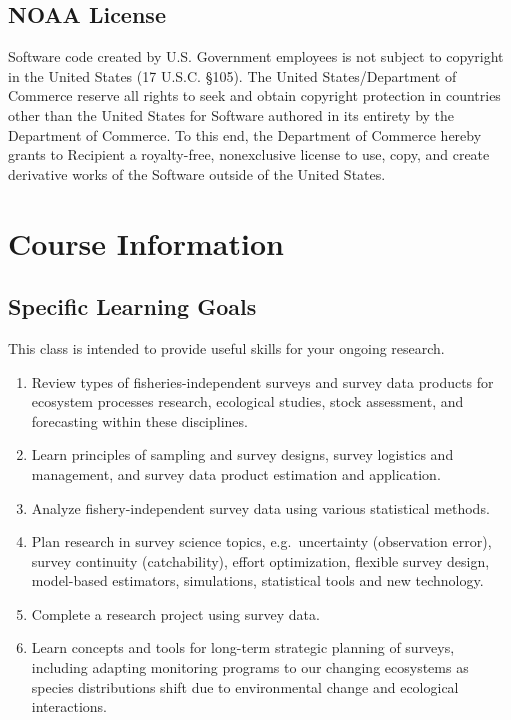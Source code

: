 \documentclass[
  letterpaper,
  oneside,
  open=any]{scrbook}
\providecommand{\tightlist}{%
  \setlength{\itemsep}{0pt}\setlength{\parskip}{0pt}}\usepackage{longtable,booktabs,array}
\begin{document}
\section{NOAA License}\label{noaa-license}

Software code created by U.S. Government employees is not subject to
copyright in the United States (17 U.S.C. §105). The United
States/Department of Commerce reserve all rights to seek and obtain
copyright protection in countries other than the United States for
Software authored in its entirety by the Department of Commerce. To this
end, the Department of Commerce hereby grants to Recipient a
royalty-free, nonexclusive license to use, copy, and create derivative
works of the Software outside of the United States.


\chapter{Course Information}\label{course-information}

\section{Specific Learning Goals}\label{specific-learning-goals}

This class is intended to provide useful skills for your ongoing
research.

\begin{enumerate}
\def\labelenumi{\arabic{enumi}.}
\tightlist
\item
  Review types of fisheries-independent surveys and survey data products
  for ecosystem processes research, ecological studies, stock
  assessment, and forecasting within these disciplines.
\item
  Learn principles of sampling and survey designs, survey logistics and
  management, and survey data product estimation and application.
\item
  Analyze fishery-independent survey data using various statistical
  methods.
\item
  Plan research in survey science topics, e.g.~uncertainty (observation
  error), survey continuity (catchability), effort optimization,
  flexible survey design, model-based estimators, simulations,
  statistical tools and new technology.
\item
  Complete a research project using survey data.
\item
  Learn concepts and tools for long-term strategic planning of surveys,
  including adapting monitoring programs to our changing ecosystems as
  species distributions shift due to environmental change and ecological
  interactions.
\end{enumerate}
\end{document}
